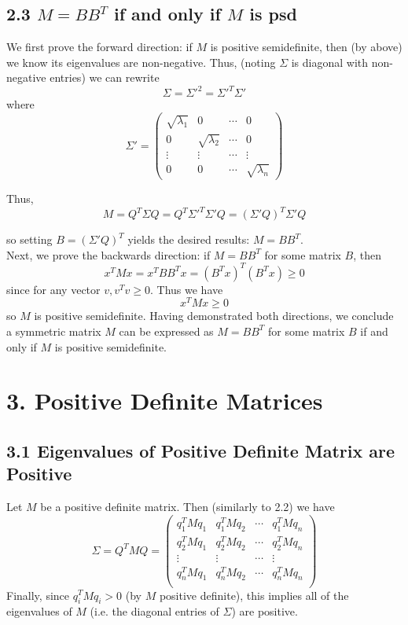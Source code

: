 \documentclass[paper=a4, fontsize=11pt]{scrartcl} %
\numberwithin{equation}{section} %
\numberwithin{figure}{section} %
\numberwithin{table}{section} %
\begin{document}
\subsection*{2.3 $M=BB^T$ if and only if $M$ is psd}

We first prove the forward direction: if $M$ is positive semidefinite, then (by above) we know its eigenvalues are non-negative. Thus, (noting $\Sigma$ is diagonal with non-negative entries) we can rewrite
\[\Sigma = {\Sigma'}^2 = {\Sigma'}^T \Sigma'\]
where
\[
\Sigma' = 
\left(
\begin{matrix}
	\sqrt{\lambda_1} & 0 & \cdots & 0 \\
	0 & \sqrt{\lambda_2} & \cdots & 0 \\
	\vdots & \vdots & \cdots & \vdots \\
	0 & 0 & \cdots & \sqrt{\lambda_n}
\end{matrix}
\right)
\]

Thus,
\[M= Q^T \Sigma Q = Q^T  {\Sigma'}^T \Sigma' Q = ({\Sigma' Q})^T \Sigma' Q\]

so setting $B = ({\Sigma' Q})^T$ yields the desired results: $M = BB^T$. \\

Next, we prove the backwards direction: if $M = BB^T$ for some matrix $B$, then
\[x^TMx = x^TB B^Tx = (B^Tx)^T (B^Tx) \geq 0 \]
 since for any vector $v, v^Tv \geq 0$. Thus we have
\[x^TMx \geq 0\]
so $M$ is positive semidefinite. Having demonstrated both directions, we conclude a symmetric matrix $M$ can be expressed as $M = BB^T$ for some matrix $B$ if and only if $M$ is positive semidefinite.


\section*{3. Positive Definite Matrices}
\subsection*{3.1 Eigenvalues of Positive Definite Matrix are Positive}

Let $M$ be a positive definite matrix. Then (similarly to 2.2) we have
\[\Sigma = Q^TMQ = \left(
\begin{matrix}
	q_1^TMq_1 & q_1^TMq_2 & \cdots & q_1^TMq_n \\ 
	q_2^TMq_1 & q_2^TMq_2 & \cdots & q_2^TMq_n \\ 
	\vdots & \vdots & \cdots & \vdots \\
	q_n^TMq_1 & q_n^TMq_2 & \cdots & q_n^TMq_n \\ 
\end{matrix}
\right)
\]
Finally, since $q_i^T M q_i > 0$ (by $M$ positive definite), this implies all of the eigenvalues of $M$ (i.e. the diagonal entries of $\Sigma$) are positive.
\end{document}
